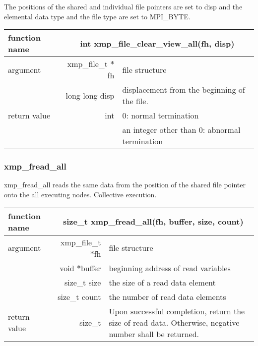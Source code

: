   The positions of the shared and individual file pointers are set to
   disp and 
   the elemental data type and the file type are set to MPI\_BYTE.
   
   \begin{table}[h]
    \begin{center}
     \begin{tabular}{|l|r|p{80mm}|}
      \hline
      {\bf function name}  & \multicolumn{2}{c|}{\bf int xmp\_file\_clear\_view\_all(fh,
      disp)} \\ \hline \hline
      argument & xmp\_file\_t $*$fh & file structure \\ \cline{2-3}
      & long long disp & displacement from the beginning of the file. \\ \hline
      return value & int & 0: normal termination \\
      &  & an integer other than 0: abnormal termination \\ \hline
      \end{tabular}
     \end{center}
    \label{tb:aaa}
   \end{table}

   \subsubsection{xmp\_fread\_all}
   xmp\_fread\_all reads the same data from the position of the shared file
   pointer onto the all executing nodes. Collective execution.

   \begin{table}[h]
    \begin{center}
     \begin{tabular}{|l|r|p{80mm}|}
      \hline
      {\bf function name}  & \multicolumn{2}{c|}{\bf size\_t
      xmp\_fread\_all(fh, buffer, size, count)}  \\ \hline \hline
      argument & xmp\_file\_t $*$fh & file structure \\ \cline{2-3}
      & void $*$buffer & beginning address of read variables \\ \cline{2-3}
      & size\_t size & the size of a read data element \\ \cline{2-3}
      & size\_t count & the number of read data elements \\ \hline
      return value & size\_t & Upon successful completion, return the size
	      of read data. Otherwise, negative number shall be
	      returned. \\ \hline
      \end{tabular}
     \end{center}
    \label{tb:aaa}
   \end{table}

